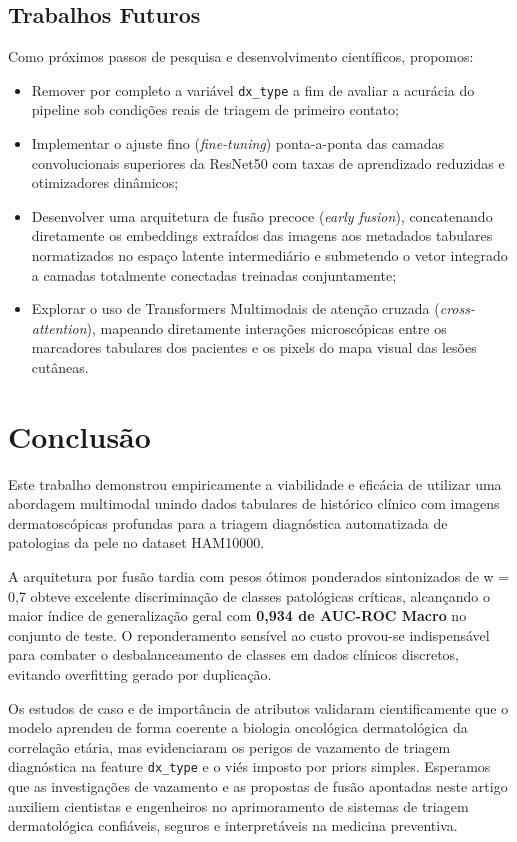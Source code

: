 \documentclass[10pt,twocolumn,letterpaper]{article}
\begin{document}
\subsection{Trabalhos Futuros}
Como próximos passos de pesquisa e desenvolvimento científicos, propomos:
\begin{itemize}
    \item Remover por completo a variável \texttt{dx\_type} a fim de avaliar a acurácia do pipeline sob condições reais de triagem de primeiro contato;
    \item Implementar o ajuste fino (\emph{fine-tuning}) ponta-a-ponta das camadas convolucionais superiores da ResNet50 com taxas de aprendizado reduzidas e otimizadores dinâmicos;
    \item Desenvolver uma arquitetura de fusão precoce (\emph{early fusion}), concatenando diretamente os embeddings extraídos das imagens aos metadados tabulares normatizados no espaço latente intermediário e submetendo o vetor integrado a camadas totalmente conectadas treinadas conjuntamente;
    \item Explorar o uso de Transformers Multimodais de atenção cruzada (\emph{cross-attention}), mapeando diretamente interações microscópicas entre os marcadores tabulares dos pacientes e os pixels do mapa visual das lesões cutâneas.
\end{itemize}

\section{Conclusão}
Este trabalho demonstrou empiricamente a viabilidade e eficácia de utilizar uma abordagem multimodal unindo dados tabulares de histórico clínico com imagens dermatoscópicas profundas para a triagem diagnóstica automatizada de patologias da pele no dataset HAM10000. 

A arquitetura por fusão tardia com pesos ótimos ponderados sintonizados de w = 0,7 obteve excelente discriminação de classes patológicas críticas, alcançando o maior índice de generalização geral com \textbf{0,934 de AUC-ROC Macro} no conjunto de teste. O reponderamento sensível ao custo provou-se indispensável para combater o desbalanceamento de classes em dados clínicos discretos, evitando overfitting gerado por duplicação. 

Os estudos de caso e de importância de atributos validaram cientificamente que o modelo aprendeu de forma coerente a biologia oncológica dermatológica da correlação etária, mas evidenciaram os perigos de vazamento de triagem diagnóstica na feature \texttt{dx\_type} e o viés imposto por priors simples. Esperamos que as investigações de vazamento e as propostas de fusão apontadas neste artigo auxiliem cientistas e engenheiros no aprimoramento de sistemas de triagem dermatológica confiáveis, seguros e interpretáveis na medicina preventiva.

{\small


}
\end{document}
